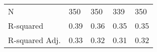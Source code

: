 {\begin{tabular}{lllll}
    \hline
    N                                         & 350                 & 350                  & 339                   & 350                     \\
    R-squared                                 & 0.39                & 0.36                 & 0.35                  & 0.35                    \\
    R-squared Adj.                            & 0.33                & 0.32                 & 0.31                  & 0.32                    \\
    \hline
    \end{tabular}
}
